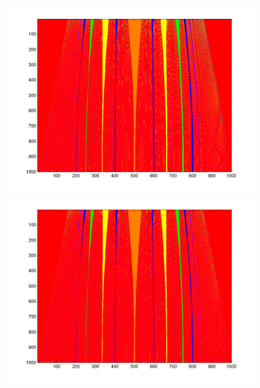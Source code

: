 \begin{figure}[htp]
\includegraphics[width=.5\textwidth]{figs/tongues_1000_L_07.png}\hfill
\includegraphics[width=.5\textwidth]{figs/tongues_1000_L_09.png}\\
\end{figure}


